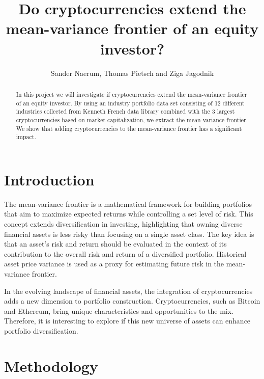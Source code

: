 \documentclass[12pt,a4paper]{article}
\title{Do cryptocurrencies extend the mean-variance frontier of an equity investor?}
\author{Sander Naerum, Thomas Pietsch and Ziga Jagodnik}
\begin{document}

\maketitle

\vspace{1cm}

\begin{abstract}
\noindent In this project we will investigate if cryptocurrencies extend the mean-variance frontier of an equity investor. 
By using an industry portfolio data set consisting of 12 different industries collected from Kenneth French data library 
combined with the 3 largest cryptocurrencies based on market capitalization, we extract the mean-variance frontier. 
We show that adding cryptocurrencies to the mean-variance frontier has a significant impact.

\end{abstract}

\clearpage
\tableofcontents
\clearpage
{}
\setcounter{page}{1}

\section{Introduction}\label{sec:intro}
The mean-variance frontier is a mathematical framework for building portfolios that aim to maximize expected returns while 
controlling a set level of risk. This concept extends diversification in investing, highlighting that owning diverse financial 
assets is less risky than focusing on a single asset class. The key idea is that an asset's risk and return should be evaluated 
in the context of its contribution to the overall risk and return of a diversified portfolio. Historical asset price variance 
is used as a proxy for estimating future risk in the mean-variance frontier.

\noindent In the evolving landscape of financial assets, the integration of cryptocurrencies adds a new dimension to portfolio
 construction. Cryptocurrencies, such as Bitcoin and Ethereum, bring unique characteristics and opportunities to the mix. 
 Therefore, it is interesting to explore if this new universe of assets can enhance portfolio diversification. 

\section{Methodology}\label{sec:methods}
\end{document}
